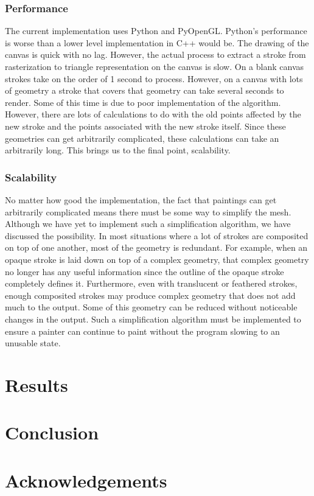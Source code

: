 \documentclass[conference]{acmsiggraph}
\begin{document}
\subsubsection{Performance}
The current implementation uses Python and PyOpenGL. Python's performance is worse than
a lower level implementation in C++ would be. The drawing of the canvas is quick with
no lag. However, the actual process to extract a stroke from rasterization to triangle
representation on the canvas is slow. On a blank canvas strokes take on the order of
1 second to process. However, on a canvas with lots of geometry a stroke that covers
that geometry can take several seconds to render. Some of this time is due to poor
implementation of the algorithm. However, there are lots of calculations
to do with the old points affected by the new stroke and the points associated with the
new stroke itself. Since these geometries can get arbitrarily complicated, these
calculations can take an arbitrarily long. This brings us to the final point, scalability.

\subsubsection{Scalability}
No matter how good the implementation, the fact that paintings can get arbitrarily complicated
means there must be some way to simplify the mesh. Although we have yet to implement
such a simplification algorithm, we have discussed the possibility. In most situations where
a lot of strokes are composited on top of one another, most of the geometry is redundant. 
For example, when an opaque stroke is laid down on top of a complex geometry, that complex
geometry no longer has any useful information since the outline of the opaque stroke
completely defines it. Furthermore, even with translucent or feathered strokes, enough
composited strokes may produce complex geometry that does not add much to the output.
Some of this geometry can be reduced without noticeable changes in the output. Such a
simplification algorithm must be implemented to ensure a painter can continue to paint
without the program slowing to an unusable state.

\section{Results}

\section{Conclusion}

\section*{Acknowledgements}



\end{document}
